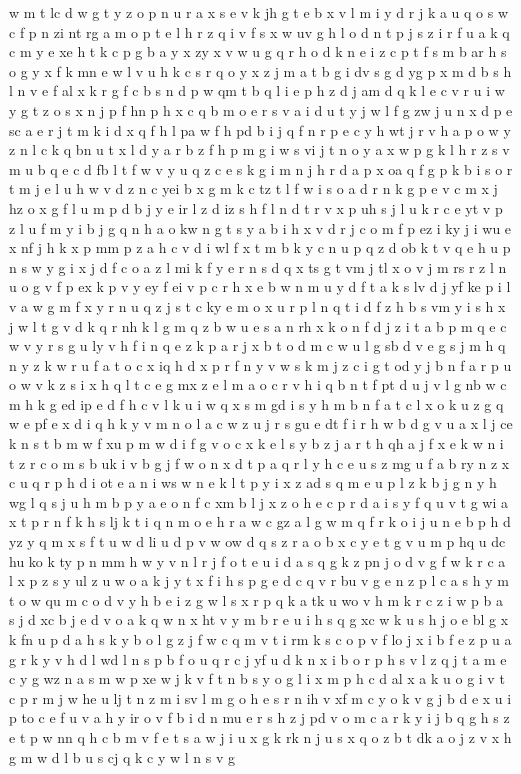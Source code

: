 \documentclass{article}
\begin{document}
w m t lc d w g t y z o p n u r a x s e v k jh g t e b x v l m i y d r j k a u q o s w c f p n zi nt rg a m o p t e l h r z q i v f s x w uv g h l o d n t p j s z i r f u a k q c m y e xe h t k c p g b a y x zy x v w u g q r h o d k n e i z c p t f s m b ar h s o g y x f k mn e w l v u h k c s r q o y x z j m a t b g i dv s g d yg p x m d b s h l n v e f al x k r g f c b s n d p w qm t b q l i e p h z d j am d q k l e c v r u i w y g t z o s x n j p f hn p h x c q b m o e r s v a i d u t y j w l f g zw j u n x d p e sc a e r j t m k i d x q f h l pa w f h pd b i j q f n r p e c y h wt j r v h a p o w y z n l c k q bn u t x l d y a r b z f h p m g i w s vi j t n o y a x w p g k l h r z s v m u b q e c d fb l t f w v y u q z c e s k g i m n j h r d a p x oa q f g p k b i s o r t m j e l u h w v d z n c yei b x g m k c tz t l f w i s o a d r n k g p e v c m x j hz o x g f l u m p d b j y e ir l z d iz s h f l n d t r v x p uh s j l u k r c e yt v p z l u f m y i b j g q n h a o kw n g t s y a b i h x v d r j c o m f p ez i ky j i wu e x nf j h k x p mm p z a h c v d i wl f x t m b k y c n u p q z d ob k t v q e h u p n s w y g i x j d f c o a z l mi k f y e r n s d q x ts g t vm j tl x o v j m rs r z l n u o g v f p ex k p v y ey f ei v p c r h x e b w n m u y d f t a k s lv d j yf ke p i l v a w g m f x y r n u q z j s t c ky e m o x u r p l n q t i d f z h b s vm y i s h x j w l t g v d k q r nh k l g m q z b w u e s a n rh x k o n f d j z i t a b p m q e c w v y r s g u ly v h f i n q e z k p a r j x b t o d m c w u l g sb d v e g s j m h q n y z k w r u f a t o c x iq h d x p r f n y v w s k m j z c i g t od y j b n f a r p u o w v k z s i x h q l t c e g mx z e l m a o c r v h i q b n t f pt d u j v l g nb w c m h k g ed ip e d f h c v l k u i w q x s m gd i s y h m b n f a t c l x o k u z g q w e pf e x d i q h k y v m n o l a c w z u j r s gu e dt f i r h w b d g v u a x l j ce k n s t b m w f xu p m w d i f g v o c x k e l s y b z j a r t h qh a j f x e k w n i t z r c o m s b uk i v b g j f w o n x d t p a q r l y h c e u s z mg u f a b ry n z x c u q r p h d i ot e a n i ws w n e k l t p y i x z ad s q m e u p l z k b j g n y h wg l q s j u h m b p y a e o n f c xm b l j x z o h e c p r d a i s y f q u v t g wi a x t p r n f k h s lj k t i q n m o e h r a w c gz a l g w m q f r k o i j u n e b p h d yz y q m x s f t u w d li u d p v w ow d q s z r a o b x c y e t g v u m p hq u dc hu ko k ty p n mm h w y v n l r j f o t e u i d a s q g k z pn j o d v g f w k r c a l x p z s y ul z u w o a k j y t x f i h s p g e d c q v r bu v g e n z p l c a s h y m t o w qu m c o d v y h b e i z g w l s x r p q k a tk u wo v h m k r c z i w p b a s j d xc b j e d v o a k q w n x ht v y m b r e u i h s q g xc w k u s h j o e bl g x k fn u p d a h s k y b o l g z j f w c q m v t i rm k s c o p v f lo j x i b f e z p u a g r k y v h d l wd l n s p b f o u q r c j yf u d k n x i b o r p h s v l z q j t a m e c y g wz n a s m w p xe w j k v f t n b s y o g l i x m p h c d al x a k u o g i v t c p r m j w he u lj t n z m i sv l m g o h e s r n ih v xf m c y o k v g j b d e x u i p to c e f u v a h y ir o v f b i d n mu e r s h z j pd v o m c a r k y i j b q g h s z e t p w nn q h c b m v f e t s a w j i u x g k rk n j u s x q o z b t dk a o j z v x h g m w d l b u s cj q k c y w l n s v g 
\end{document}
